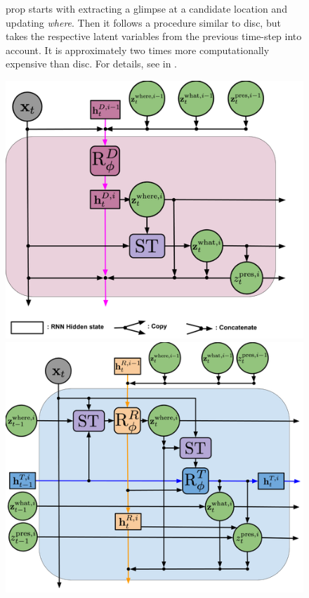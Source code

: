 \begin{figure}
\begin{minipage}[c]{0.49\linewidth}
{            \Gls{prop} starts with extracting a glimpse at a candidate location and updating \textit{where}. Then it follows a procedure similar to \gls{disc}, but takes the respective latent variables from the previous time-step into account. 
            It is approximately two times more computationally expensive than \gls{disc}.
            For details, see  in .
    }
    \label{fig:sqair_inf_detail}
    \end{minipage}
    \begin{minipage}[c]{0.43\linewidth}
        \centering
        \includegraphics[width=\linewidth]{figures/SQAIR/diagrams/disc}
    \end{minipage}
    \hfill
    \begin{minipage}[c]{0.55\linewidth}
        \centering
        \includegraphics[width=\linewidth]{figures/SQAIR/diagrams/prop}
    \end{minipage}
\end{figure}

